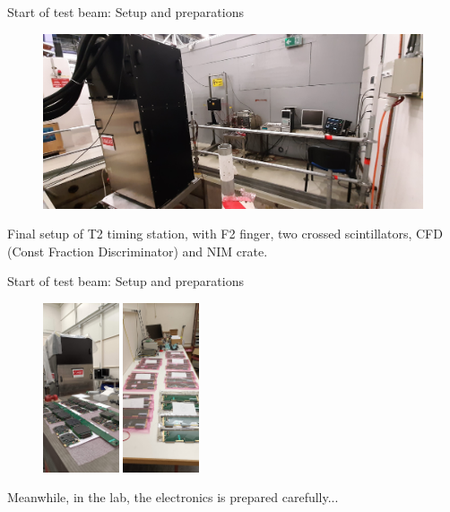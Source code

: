 \documentclass[xcolor = table]{beamer}
\begin{document}
\begin{frame}{Start of test beam: Setup and preparations}
  \begin{figure}
    \centering
    \includegraphics[width = 1.0\textwidth]{Plots/T2_overview.jpg}
  \end{figure}
  \vspace{-0.2cm}
  \begin{center}
    \large Final setup of T2 timing station, with F2 finger, two crossed scintillators, CFD (Const Fraction Discriminator) and NIM crate.
  \end{center}
\end{frame}

\begin{frame}{Start of test beam: Setup and preparations}
  \begin{figure}
    \centering
    \includegraphics[width = 0.2\textwidth]{Plots/Electronics_1.jpg}
    \hspace{1cm}
    \includegraphics[width = 0.2\textwidth]{Plots/Electronics_2.jpg}
  \end{figure}
  \vspace{-0.2cm}
  \begin{center}
    \large Meanwhile, in the lab, the electronics is prepared carefully...
  \end{center}
\end{frame}
\end{document}
